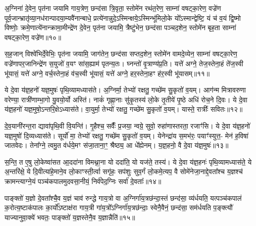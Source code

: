 अ॒ग्निना॑ दे॒वेन॒ पृत॑ना जयामि गाय॒त्रेण॒ छन्द॑सा त्रि॒वृता॒ स्तोमे॑न रथंत॒रेण॒ साम्ना॑ वषट्का॒रेण॒ वज्रे॑ण पूर्व॒जान्भ्रातृ॑व्या॒नध॑रान्पादया॒म्यवै॑नान्बाधे॒ प्रत्ये॑नान्नुदे॒\-ऽस्मिन्क्षये॒\-ऽस्मिन्भू॑मिलो॒के यो᳚\-ऽस्मान्द्वेष्टि॒ यं च॑ व॒यं द्वि॒ष्मो विष्णोः॒ क्रमे॒णात्ये॑नान्क्रामा॒मीन्द्रे॑ण दे॒वेन॒ पृत॑ना जयामि॒ त्रैष्टु॑भेन॒ छन्द॑सा पञ्चद॒शेन॒ स्तोमे॑न बृह॒ता साम्ना॑ वषट्का॒रेण॒ वज्रे॑ण॥१०॥

स॒ह॒जान् विश्वे॑भिर्दे॒वेभिः॒ पृत॑ना जयामि॒ जाग॑तेन॒ छन्द॑सा सप्तद॒शेन॒ स्तोमे॑न वामदे॒व्येन॒ साम्ना॑ वषट्का॒रेण॒ वज्रे॑णापर॒जानिन्द्रे॑ण स॒युजो॑ व॒यꣳ सा॑स॒ह्याम॑ पृतन्य॒तः। घ्नन्तो॑ वृ॒त्राण्य॑प्र॒ति। यत्ते॑ अग्ने॒ तेज॒स्तेना॒हं ते॑ज॒स्वी भू॑यासं॒ यत्ते॑ अग्ने॒ वर्च॒स्तेना॒हं व॑च॒स्वी भू॑यासं॒ यत्ते॑ अग्ने॒ हर॒स्तेना॒हꣳ ह॑र॒स्वी भू॑यासम्॥११॥

{}

ये दे॒वा य॑ज्ञ॒हनो॑ यज्ञ॒मुषः॑ पृथि॒व्यामध्यास॑ते। अ॒ग्निर्मा॒ तेभ्यो॑ रक्षतु॒ गच्छे॑म सु॒कृतो॑ व॒यम्। आग॑न्म मित्रावरुणा वरेण्या॒ रात्री॑णाम्भा॒गो यु॒वयो॒र्यो अस्ति॑। नाकं॑ गृह्णा॒नाः सु॑कृ॒तस्य॑ लो॒के तृ॒तीये॑ पृ॒ष्ठे अधि॑ रोच॒ने दि॒वः। ये दे॒वा य॑ज्ञ॒हनो॑ यज्ञ॒मुषो॒\-ऽन्तरि॒क्षे\-ऽध्यास॑ते। वा॒युर्मा॒ तेभ्यो॑ रक्षतु॒ गच्छे॑म सु॒कृतो॑ व॒यम्। यास्ते॒ रात्रीः᳚ सवितः॥१२॥

दे॒व॒यानी॑रन्त॒रा द्यावा॑पृथि॒वी वि॒यन्ति॑। गृ॒हैश्च॒ सर्वैः᳚ प्र॒जया॒ न्वग्रे॒ सुवो॒ रुहा॑णास्तरता॒ रजाꣳ॑सि। ये दे॒वा य॑ज्ञ॒हनो॑ यज्ञ॒मुषो॑ दि॒व्यध्यास॑ते। सूर्यो॑ मा॒ तेभ्यो॑ रक्षतु॒ गच्छे॑म सु॒कृतो॑ व॒यम्। येनेन्द्रा॑य स॒मभ॑रः॒ पयाꣳ॑स्युत्त॒- मेन॑ ह॒विषा॑ जातवेदः। तेना᳚ग्ने॒ त्वमु॒त व॑र्धये॒मꣳ स॑जा॒ताना॒ꣳ॒ श्रैष्ठ्य॒ आ धे᳚ह्येनम्। य॒ज्ञ॒हनो॒ वै दे॒वा य॑ज्ञ॒मुषः॑॥१३॥

स॒न्ति॒ त ए॒षु लो॒केष्वा॑सत आ॒ददा॑ना विमथ्ना॒ना यो ददा॑ति॒ यो यज॑ते॒ तस्य॑। ये दे॒वा य॑ज्ञ॒हनः॑ पृथि॒व्यामध्यास॑ते॒ ये अ॒न्तरि॑क्षे॒ ये दि॒वीत्या॑हे॒माने॒व लो॒काꣳस्ती॒र्त्वा सगृ॑हः॒ सप॑शुः सुव॒र्गं लो॒कमे॒त्यप॒ वै सोमे॑नेजा॒नाद्दे॒वता᳚श्च य॒ज्ञश्च॑ क्रामन्त्याग्ने॒यं पञ्च॑कपालमुदवसा॒नीयं॒ निर्व॑पेद॒ग्निः सर्वा॑ दे॒वताः᳚॥१४॥

पाङ्क्तो॑ य॒ज्ञो दे॒वता᳚श्चै॒व य॒ज्ञं चाव॑ रुन्द्धे गाय॒त्रो वा अ॒ग्निर्गा॑य॒त्रछ॑न्दा॒स्तं छन्द॑सा॒ व्य॑र्धयति॒ यत्पञ्च॑कपालं क॒रोत्य॒ष्टाक॑पालः का॒र्यो᳚\-ऽष्टाक्ष॑रा गाय॒त्री गा॑य॒त्रो᳚\-ऽग्निर्गा॑य॒त्रछ॑न्दाः॒ स्वेनै॒वैनं॒ छन्द॑सा॒ सम॑र्धयति प॒ङ्क्त्यौ॑ याज्यानुवा॒क्ये॑ भवतः॒ पाङ्क्तो॑ य॒ज्ञस्तेनै॒व य॒ज्ञान्नैति॑॥१५॥

{\anuvakamend[{स॒वि॒त॒र्दे॒वा य॑ज्ञ॒मुषः॒ सर्वा॑ दे॒वता॒स्त्रिच॑त्वारिꣳशच्च॥४॥}]}


